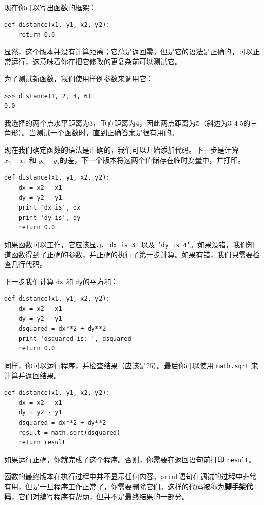 现在你可以写出函数的框架：

\beforeverb
\begin{verbatim}
def distance(x1, y1, x2, y2):
    return 0.0
\end{verbatim}
\afterverb
%
显然，这个版本并没有计算距离；它总是返回零。但是它的语法是正确的，可以正常运行，这意味着你在把它修改的更复杂前可以测试它。

为了测试新函数，我们使用样例参数来调用它：

\beforeverb
\begin{verbatim}
>>> distance(1, 2, 4, 6)
0.0
\end{verbatim}
\afterverb
%
我选择的两个点水平距离为3，垂直距离为4，因此两点距离为5（斜边为3-4-5的三角形）。当测试一个函数时，直到正确答案是很有用的。


现在我们确定函数的语法是正确的，我们可以开始添加代码。下一步是计算$x_2 - x_1$ 和 $y_2 - y_1$的差，下一个版本将这两个值储存在临时变量中，并打印。

\beforeverb
\begin{verbatim}
def distance(x1, y1, x2, y2):
    dx = x2 - x1
    dy = y2 - y1
    print 'dx is', dx
    print 'dy is', dy
    return 0.0
\end{verbatim}
\afterverb
%
如果函数可以工作，它应该显示 \verb"'dx is 3'" 以及 {\tt 'dy is 4'}。如果没错，我们知道函数得到了正确的参数，并正确的执行了第一步计算。如果有错，我们只需要检查几行代码。

下一步我们计算 {\tt dx} 和 {\tt dy}的平方和：

\beforeverb
\begin{verbatim}
def distance(x1, y1, x2, y2):
    dx = x2 - x1
    dy = y2 - y1
    dsquared = dx**2 + dy**2
    print 'dsquared is: ', dsquared
    return 0.0
\end{verbatim}
\afterverb
%
同样，你可以运行程序，并检查结果（应该是25）。最后你可以使用 {\tt math.sqrt} 来计算并返回结果。


\beforeverb
\begin{verbatim}
def distance(x1, y1, x2, y2):
    dx = x2 - x1
    dy = y2 - y1
    dsquared = dx**2 + dy**2
    result = math.sqrt(dsquared)
    return result
\end{verbatim}
\afterverb
%
如果运行正确，你就完成了这个程序。否则，你需要在返回语句前打印 {\tt result}。

函数的最终版本在执行过程中并不显示任何内容。{\tt print}语句在调试的过程中非常有用，但是一旦程序工作正常了，你需要删除它们。这样的代码被称为{\bf 脚手架代码}，它们对编写程序有帮助，但并不是最终结果的一部分。

